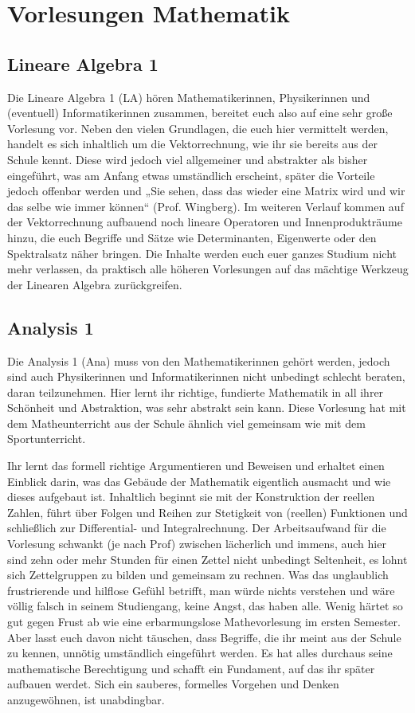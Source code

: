 \section*{Vorlesungen Mathematik}

\subsection{Lineare Algebra 1}
\label{la1}
Die Lineare Algebra 1 (\gls{LA}) hören Mathematikerinnen, Physikerinnen und (eventuell) Informatikerinnen zusammen, bereitet euch also auf eine sehr große Vorlesung vor. Neben den vielen Grundlagen, die euch hier vermittelt werden,  handelt es sich inhaltlich um die Vektorrechnung, wie ihr sie bereits aus der Schule kennt. Diese wird jedoch viel allgemeiner und abstrakter als bisher eingeführt, was am Anfang etwas umständlich erscheint, später die Vorteile jedoch offenbar werden und „Sie sehen, dass das wieder eine Matrix wird und wir das selbe wie immer können“ (Prof. Wingberg). Im weiteren Verlauf kommen auf der Vektorrechnung aufbauend noch lineare Operatoren und Innenprodukträume hinzu, die euch Begriffe und Sätze wie Determinanten, Eigenwerte oder den Spektralsatz näher bringen. Die Inhalte werden euch euer ganzes Studium nicht mehr verlassen, da praktisch alle höheren Vorlesungen auf das mächtige Werkzeug der Linearen Algebra zurückgreifen.

\subsection{Analysis 1}
\label{ana1}
Die Analysis 1 (\gls{Ana}) muss von den Mathematikerinnen gehört werden, jedoch sind auch Physikerinnen und Informatikerinnen nicht unbedingt schlecht beraten, daran teilzunehmen. Hier lernt ihr richtige, fundierte Mathematik in all ihrer Schönheit und Abstraktion, was sehr abstrakt sein kann. Diese Vorlesung hat mit dem Matheunterricht aus der Schule ähnlich viel gemeinsam wie mit dem Sportunterricht.

Ihr lernt das formell richtige Argumentieren und Beweisen und erhaltet einen Einblick darin, was das Gebäude der Mathematik eigentlich ausmacht und wie dieses aufgebaut ist. Inhaltlich beginnt sie mit der Konstruktion der reellen Zahlen, führt über Folgen und Reihen zur Stetigkeit von (reellen) Funktionen und schließlich zur Differential- und Integralrechnung. Der Arbeitsaufwand für die Vorlesung schwankt (je nach Prof) zwischen lächerlich und immens, auch hier sind zehn oder mehr Stunden für einen Zettel nicht unbedingt Seltenheit, es lohnt sich Zettelgruppen zu bilden und gemeinsam zu rechnen. Was das unglaublich frustrierende und hilflose Gefühl betrifft, man würde nichts verstehen und wäre völlig falsch in seinem Studiengang, keine Angst, das haben alle. Wenig härtet so gut gegen Frust ab wie eine erbarmungslose Mathevorlesung im ersten Semester. Aber lasst euch davon nicht täuschen, dass Begriffe, die ihr meint aus der Schule zu kennen, unnötig umständlich eingeführt werden. Es hat alles durchaus seine mathematische Berechtigung und schafft ein Fundament, auf das ihr später aufbauen werdet. Sich ein sauberes, formelles Vorgehen und Denken anzugewöhnen, ist unabdingbar.

